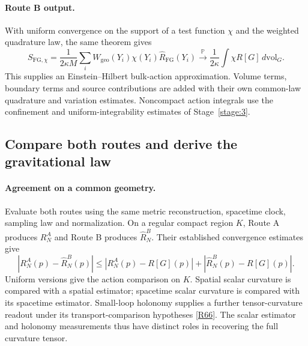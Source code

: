 \documentclass[11pt,a4paper]{article}
\begin{document}
\paragraph{Route B output.}
With uniform convergence on the support of a test function $\chi$ and the
weighted quadrature law, the same theorem gives
\[
S_{\mathrm{FG},\chi}=\frac1{2\kappa M}\sum_i
 W_{\mathrm{geo}}(Y_i)\chi(Y_i)\widehat R_{\mathrm{FG}}(Y_i)
\xrightarrow{\mathbb P}
\frac1{2\kappa}\int\chi R[G]\,d\mathrm{vol}_G.
\]
This supplies an Einstein--Hilbert bulk-action approximation. Volume terms,
boundary terms and source contributions are added with their own common-law
quadrature and variation estimates. Noncompact action integrals use the
confinement and uniform-integrability estimates of Stage~\ref{stage:3}.

\clearpage
\subsection{Compare both routes and derive the gravitational law}

\paragraph{Agreement on a common geometry.}
Evaluate both routes using the same metric reconstruction, spacetime clock,
sampling law and normalization. On a regular compact region $K$, Route A
produces $R_N^{A}$ and Route B produces $\widehat R_N^{B}$. Their established
convergence estimates give
\[
|R_N^{A}(p)-\widehat R_N^{B}(p)|
\le |R_N^{A}(p)-R[G](p)|
 +|\widehat R_N^{B}(p)-R[G](p)|.
\]
Uniform versions give the action comparison on $K$. Spatial scalar curvature
is compared with a spatial estimator; spacetime scalar curvature is compared
with its spacetime estimator. Small-loop holonomy supplies a further
tensor-curvature readout under its transport-comparison hypotheses
\hyperref[src:thm-riemann-scutoid]{[R66]}. The scalar estimator and holonomy measurements thus
have distinct roles in recovering the full curvature tensor.
\end{document}
